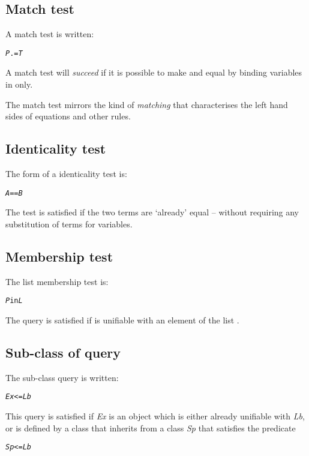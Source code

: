 \subsection{Match test}
\label{goal:match}

A match test is written:
\begin{alltt}
\emph{P} .= \emph{T}
\end{alltt}
A match test will \emph{succeed} if it is possible to make  and  equal by binding variables in  only.

The match test  mirrors the kind of \emph{matching} that characterises the left hand sides of equations and other rules.
 
\subsection{Identicality test}
\label{goal:identical}

The form of a identicality test is:
\begin{alltt}
\emph{A} == \emph{B}
\end{alltt}
The \q{==} test is satisfied if the two terms are `already' equal -- without requiring any substitution of terms for variables. 

\subsection{Membership test}
\label{goal:element}

The list membership test is:
\begin{alltt}
\emph{P} in \emph{L}
\end{alltt}
The  query is satisfied if  is unifiable with an element of the list .

\subsection{Sub-class of query}
\label{goal:subclass}
The sub-class query is written:
\begin{alltt}
\emph{Ex} <= \emph{Lb}
\end{alltt}
This query is satisfied if \emph{Ex} is an object which is either already unifiable with \emph{Lb}, or is defined by a class that inherits from a class \emph{Sp} that satisfies the predicate
\begin{alltt}
\emph{Sp} <= \emph{Lb}
\end{alltt}

